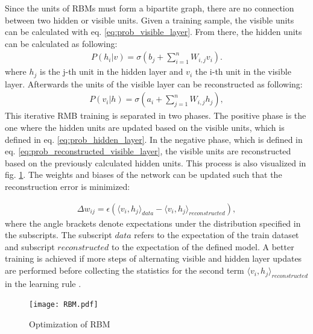 Since the units of RBMs must form a bipartite graph, there are no connection between two hidden or visible units. Given a training sample, the visible units can be calculated with eq. \ref{eq:prob_visible_layer}. From there, the hidden units can be calculated as following:
\begin{equation}
\begin{aligned}
    P(h_{i}|v) = \sigma(b_{j} + \sum_{i=1}^{n} W_{i,j} v_{i}).
    \label{eq:prob_hidden_layer}
\end{aligned}
\end{equation}
where $h_{j}$ is the j-th unit in the hidden layer and $v_{i}$ the i-th unit in the visible layer. Afterwards the units of the visible layer can be reconstructed as following:
\begin{equation}
\begin{aligned}
    P(v_{i}|h) = \sigma(a_{i} + \sum_{j=1}^{n} W_{i,j} h_{j}),
    \label{eq:prob_reconstructed_visible_layer}
\end{aligned}
\end{equation}
This iterative RMB training is separated in two phases. The positive phase is the one where the hidden units are updated based on the visible units, which is defined in eq. \ref{eq:prob_hidden_layer}. In the negative phase, which is defined in eq. \ref{eq:prob_reconstructed_visible_layer}, the visible units are reconstructed based on the previously calculated hidden units. This process is also visualized in fig. \ref{fig:RBM}. The weights and biases of the network can be updated such that the reconstruction error is minimized:

\begin{equation}
\begin{aligned}
    \Delta w_{ij} = \epsilon(\langle v_{i}, h_{j}\rangle_{data}- \langle v_{i}, h_{j}\rangle_{reconstructed}), 
    \label{eq:RBM_weight_update}
\end{aligned}
\end{equation}
where the angle brackets denote expectations under the distribution specified in the subscripts. The subscript $data$ refers to the expectation of the train dataset and subscript $reconstructed$ to the expectation of the defined model. A better training is achieved if more steps of alternating visible and hidden layer updates are performed before collecting the statistics for the second term $\langle v_{i}, h_{j}\rangle_{reconstructed}$ in the learning rule \cite{Hinton2010}.

\begin{figure}[H]
  \centering
  \texttt{[image: RBM.pdf]}
  \caption {Optimization of RBM} \label{fig:RBM}
\end{figure}


